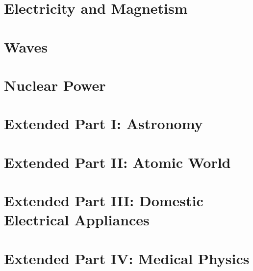\documentclass[12pt]{article}
\begin{document}
    \newpage
    \section{Electricity and Magnetism}

    \newpage
    \section{Waves}

    \newpage
    \section{Nuclear Power}

    \newpage
    \section{Extended Part I: Astronomy}

    \newpage
    \section{Extended Part II: Atomic World}

    \newpage
    \section{Extended Part III: Domestic Electrical Appliances}

    \newpage
    \section{Extended Part IV: Medical Physics}
\end{document}
